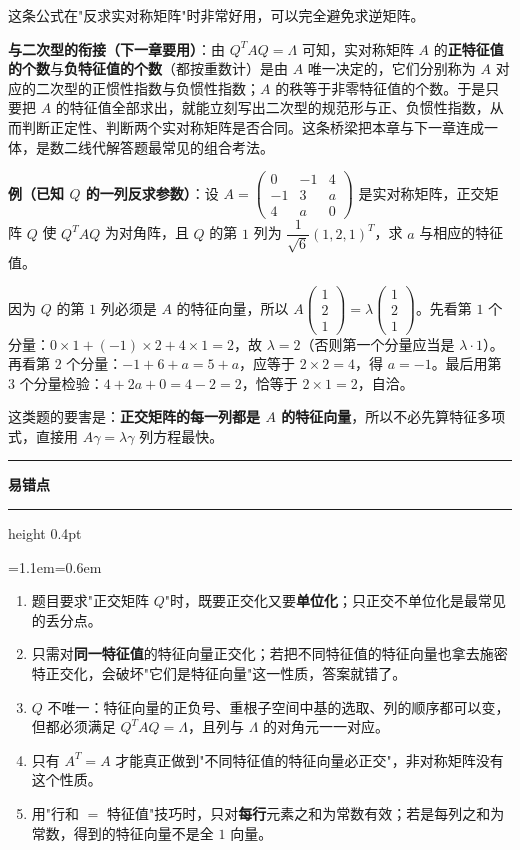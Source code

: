 \documentclass[11pt,openany,UTF8]{ctexbook}
\newcommand{\callouthead}[2]{%
  \par\addvspace{7pt}\noindent
  {\color{#1}\rule[-0.15em]{3pt}{1.05em}}\hspace{0.5em}%
  {\bfseries\color{#1}#2}\par\nobreak\vspace{-0.35em}%
  {\color{rulesep}\hrule height 0.4pt}\nobreak\vspace{0.45em}%
  \begingroup\small\setlength{\parindent}{0pt}%
  \leftskip=1.1em\rightskip=0.6em\noindent\ignorespaces}
\newcommand{\calloutend}{\par\endgroup\addvspace{7pt}}
\newenvironment{callwarn}[1]{\callouthead{warnbar}{#1}}{\calloutend}
\begin{document}
这条公式在"反求实对称矩阵"时非常好用，可以完全避免求逆矩阵。

\textbf{与二次型的衔接（下一章要用）}：由 $Q^TAQ=\Lambda$ 可知，实对称矩阵 $A$ 的\textbf{正特征值的个数}与\textbf{负特征值的个数}（都按重数计）是由 $A$ 唯一决定的，它们分别称为 $A$ 对应的二次型的正惯性指数与负惯性指数；$A$ 的秩等于非零特征值的个数。于是只要把 $A$ 的特征值全部求出，就能立刻写出二次型的规范形与正、负惯性指数，从而判断正定性、判断两个实对称矩阵是否合同。这条桥梁把本章与下一章连成一体，是数二线代解答题最常见的组合考法。

\textbf{例（已知 $Q$ 的一列反求参数）}：设 $A=\begin{pmatrix}0&-1&4\\-1&3&a\\4&a&0\end{pmatrix}$ 是实对称矩阵，正交矩阵 $Q$ 使 $Q^TAQ$ 为对角阵，且 $Q$ 的第 $1$ 列为 $\dfrac{1}{\sqrt6}(1,2,1)^T$，求 $a$ 与相应的特征值。

因为 $Q$ 的第 $1$ 列必须是 $A$ 的特征向量，所以 $A\begin{pmatrix}1\\2\\1\end{pmatrix}=\lambda\begin{pmatrix}1\\2\\1\end{pmatrix}$。先看第 $1$ 个分量：$0\times1+(-1)\times2+4\times1=2$，故 $\lambda=2$（否则第一个分量应当是 $\lambda\cdot1$）。再看第 $2$ 个分量：$-1+6+a=5+a$，应等于 $2\times2=4$，得 $a=-1$。最后用第 $3$ 个分量检验：$4+2a+0=4-2=2$，恰等于 $2\times1=2$，自洽。

这类题的要害是：\textbf{正交矩阵的每一列都是 $A$ 的特征向量}，所以不必先算特征多项式，直接用 $A\gamma=\lambda\gamma$ 列方程最快。

\begin{callwarn}{易错点}
\begin{enumerate}
\item 题目要求"正交矩阵 $Q$"时，既要正交化又要\textbf{单位化}；只正交不单位化是最常见的丢分点。
\item 只需对\textbf{同一特征值}的特征向量正交化；若把不同特征值的特征向量也拿去施密特正交化，会破坏"它们是特征向量"这一性质，答案就错了。
\item $Q$ 不唯一：特征向量的正负号、重根子空间中基的选取、列的顺序都可以变，但都必须满足 $Q^TAQ=\Lambda$，且列与 $\Lambda$ 的对角元一一对应。
\item 只有 $A^T=A$ 才能真正做到"不同特征值的特征向量必正交"，非对称矩阵没有这个性质。
\item 用"行和 $=$ 特征值"技巧时，只对\textbf{每行}元素之和为常数有效；若是每列之和为常数，得到的特征向量不是全 $1$ 向量。
\end{enumerate}
\end{callwarn}
\end{document}
